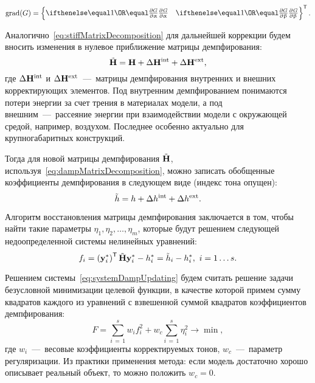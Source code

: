 \begin{equation}
	\mathrm{grad}(G) = 
	\trans{
	\left\{ 
	\begin{matrix}
		\partDer{G}{\alpha}{} & \partDer{G}{\beta}{} 
	\end{matrix} 
	\right\}}.
\end{equation}

Аналогично~\eqref{eq:stiffMatrixDecomposition} для дальнейшей коррекции будем вносить изменения в нулевое приближение матрицы демпфирования:
\begin{equation}
	\tilde{\mathbf{H}} = \mathbf{H} + \Delta \mathbf{H} ^ {\text{int}} + \Delta \mathbf{H} ^ {\text{ext}},
	\label{eq:dampMatrixDecomposition}
\end{equation}
где $ \Delta \mathbf{H} ^ {\text{int}} $ и $ \Delta \mathbf{H} ^ {\text{ext}} $~---~матрицы демпфирования внутренних и внешних корректирующих элементов. Под внутренним демпфированием понимаются потери энергии за счет трения в материалах модели, а под внешним~---~рассеяние энергии при взаимодействии модели с окружающей средой, например, воздухом. Последнее особенно актуально для крупногабаритных конструкций.

Тогда для новой матрицы демпфирования $ \tilde{\mathbf{H}} $, используя~\eqref{eq:dampMatrixDecomposition}, можно записать обобщенные коэффициенты демпфирования в следующем виде (индекс тона опущен):
\begin{equation}
	\tilde{h} = h + \Delta h ^ {\text{int}} + \Delta h ^ {\text{ext}}.
	\label{eq:updatedGenDamping}
\end{equation}

Алгоритм восстановления матрицы демпфирования заключается в том, чтобы найти такие параметры $ \eta_1, \eta_2, \hdots, \eta_m $, которые будут решением следующей недоопределенной системы нелинейных уравнений:
\begin{equation}
	f_i = \left( \mathbf{y}_i ^ \ast \right) ^ \mathsf{T} \tilde{\mathbf{H}} \mathbf{y}_i ^ \ast - h_i ^ \ast = \tilde{h}_i - h_i ^ \ast, \ i = 1 \hdots s.
	\label{eq:systemDampUpdating}
\end{equation}

Решением системы~\eqref{eq:systemDampUpdating} будем считать решение задачи безусловной минимизации целевой функции, в качестве которой примем сумму квадратов каждого из уравнений с взвешенной суммой квадратов коэффициентов демпфирования:
\begin{equation}
	F = \sum \limits_{i\,=\,1} ^ s w_i f_i ^ 2 + w_c \sum \limits_{i\,=\,1}^s \eta_i ^ 2 \rightarrow \min,
	\label{eq:objFinalDampFunUpdating}
\end{equation}
где $ w_i $~---~весовые коэффициенты корректируемых тонов, $ w_c $~---~параметр регуляризации. Из практики применения метода: если модель достаточно хорошо описывает реальный объект, то можно положить $ w_c = 0 $.

